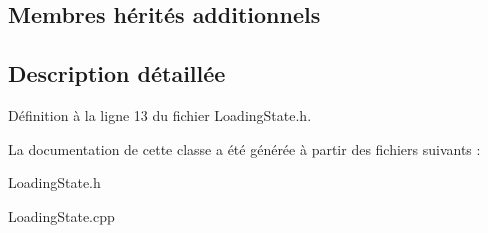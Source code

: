 \subsection*{Membres hérités additionnels}


\subsection{Description détaillée}


Définition à la ligne 13 du fichier Loading\+State.\+h.



La documentation de cette classe a été générée à partir des fichiers suivants \+:\begin{DoxyCompactItemize}
\item 
Loading\+State.\+h\item 
Loading\+State.\+cpp\end{DoxyCompactItemize}
